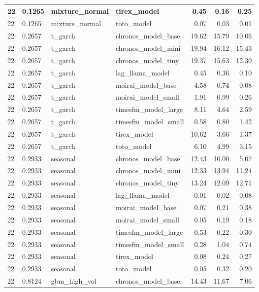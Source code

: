 {\begin{tabular}{llllrrr}
22 & 0.1265 & mixture\_normal & tirex\_model & 0.45 & 0.16 & 0.25 \\
\midrule
22 & 0.1265 & mixture\_normal & toto\_model & 0.07 & 0.03 & 0.01 \\
\midrule
22 & 0.2657 & t\_garch & chronos\_model\_base & 19.62 & 15.79 & 10.06 \\
\midrule
22 & 0.2657 & t\_garch & chronos\_model\_mini & 19.94 & 16.12 & 15.43 \\
\midrule
22 & 0.2657 & t\_garch & chronos\_model\_tiny & 19.37 & 15.63 & 12.30 \\
\midrule
22 & 0.2657 & t\_garch & lag\_llama\_model & 0.45 & 0.36 & 0.10 \\
\midrule
22 & 0.2657 & t\_garch & moirai\_model\_base & 4.58 & 0.74 & 0.08 \\
\midrule
22 & 0.2657 & t\_garch & moirai\_model\_small & 1.91 & 0.99 & 0.26 \\
\midrule
22 & 0.2657 & t\_garch & timesfm\_model\_large & 8.11 & 4.64 & 2.59 \\
\midrule
22 & 0.2657 & t\_garch & timesfm\_model\_small & 0.58 & 0.80 & 1.42 \\
\midrule
22 & 0.2657 & t\_garch & tirex\_model & 10.62 & 3.66 & 1.37 \\
\midrule
22 & 0.2657 & t\_garch & toto\_model & 6.10 & 4.99 & 3.15 \\
\midrule
22 & 0.2933 & seasonal & chronos\_model\_base & 12.43 & 10.00 & 5.07 \\
\midrule
22 & 0.2933 & seasonal & chronos\_model\_mini & 12.33 & 13.94 & 11.24 \\
\midrule
22 & 0.2933 & seasonal & chronos\_model\_tiny & 13.24 & 12.09 & 12.71 \\
\midrule
22 & 0.2933 & seasonal & lag\_llama\_model & 0.01 & 0.02 & 0.08 \\
\midrule
22 & 0.2933 & seasonal & moirai\_model\_base & 0.07 & 0.21 & 0.38 \\
\midrule
22 & 0.2933 & seasonal & moirai\_model\_small & 0.05 & 0.19 & 0.18 \\
\midrule
22 & 0.2933 & seasonal & timesfm\_model\_large & 0.53 & 0.22 & 0.30 \\
\midrule
22 & 0.2933 & seasonal & timesfm\_model\_small & 0.28 & 1.04 & 0.74 \\
\midrule
22 & 0.2933 & seasonal & tirex\_model & 0.08 & 0.24 & 0.27 \\
\midrule
22 & 0.2933 & seasonal & toto\_model & 0.05 & 0.32 & 0.20 \\
\midrule
22 & 0.8124 & gbm\_high\_vol & chronos\_model\_base & 14.43 & 11.67 & 7.06 \\

\end{tabular}}
